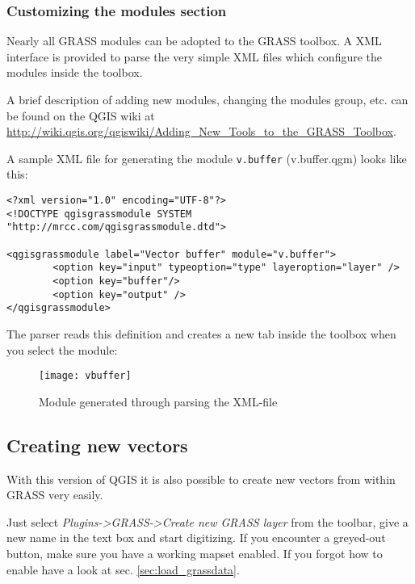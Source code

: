 \subsubsection{Customizing the modules section} 
\label{sec:toolbox-customizing}

Nearly all GRASS modules can be adopted to the GRASS toolbox. A XML interface is provided to parse
the very simple XML files which configure the modules inside the toolbox.

A brief description of adding new modules, changing the modules group, etc. can be found on the QGIS wiki
at \url{http://wiki.qgis.org/qgiswiki/Adding_New_Tools_to_the_GRASS_Toolbox}.

A sample XML file for generating the module \texttt{v.buffer} (v.buffer.qgm) looks like this:
\begin{verbatim}
<?xml version="1.0" encoding="UTF-8"?>
<!DOCTYPE qgisgrassmodule SYSTEM "http://mrcc.com/qgisgrassmodule.dtd">

<qgisgrassmodule label="Vector buffer" module="v.buffer">
        <option key="input" typeoption="type" layeroption="layer" />
        <option key="buffer"/>
        <option key="output" />
</qgisgrassmodule>
\end{verbatim}

The parser reads this definition and creates a new tab inside the toolbox when you select 
the module:
\begin{figure}[h]
\centering
\caption{Module generated through parsing the XML-file}\label{fig:buffer-module}
\texttt{[image: vbuffer]}
\end{figure}

\subsection{Creating new vectors}\label{sec:creating_new_grass_vectors}

With this version of QGIS it is also possible to create new vectors from within GRASS very
easily.

Just select \textsl{Plugins->GRASS->Create new GRASS layer} from the toolbar, give a new name
in the text box and start digitizing.
If you encounter a greyed-out button, make sure you have a working mapset enabled. If you forgot
how to enable have a look at sec. \ref{sec:load_grassdata}.

